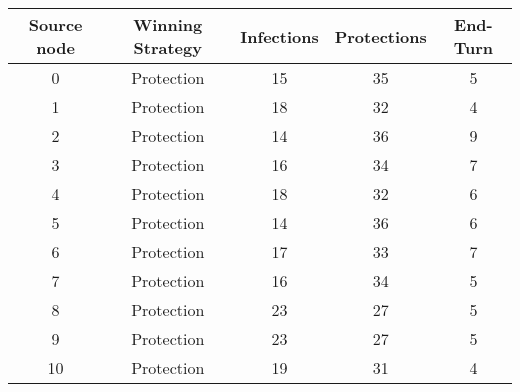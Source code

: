 \documentclass[results.tex]{subfiles}
\begin{document}
    \begin{center}
        \begin{tabular}{| c || c | c | c | c |}
            \hline
            {\bfseries Source node} & {\bfseries Winning Strategy} & {\bfseries Infections} & {\bfseries Protections}
            & {\bfseries End-Turn}
            \\  %
            \hline\hline
            0                       & Protection                   & 15                     & 35                      & 5                    \\
            \hline
            1                       & Protection                   & 18                     & 32                      & 4                    \\
            \hline
            2                       & Protection                   & 14                     & 36                      & 9                    \\
            \hline
            3                       & Protection                   & 16                     & 34                      & 7                    \\
            \hline
            4                       & Protection                   & 18                     & 32                      & 6                    \\
            \hline
            5                       & Protection                   & 14                     & 36                      & 6                    \\
            \hline
            6                       & Protection                   & 17                     & 33                      & 7                    \\
            \hline
            7                       & Protection                   & 16                     & 34                      & 5                    \\
            \hline
            8                       & Protection                   & 23                     & 27                      & 5                    \\
            \hline
            9                       & Protection                   & 23                     & 27                      & 5                    \\
            \hline
            10                      & Protection                   & 19                     & 31                      & 4                    \\

\end{tabular}
\end{center}
\end{document}
